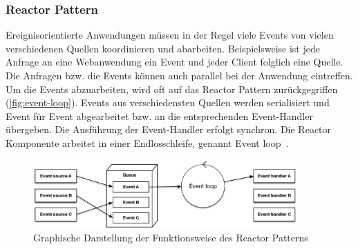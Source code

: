\subsubsection{Reactor Pattern}
Ereignisorientierte Anwendungen müssen in der Regel viele Events von vielen verschiedenen Quellen koordinieren und abarbeiten. Beispielsweise ist jede Anfrage an eine Webanwendung ein Event und jeder Client folglich eine Quelle. Die Anfragen bzw. die Events können auch parallel bei der Anwendung eintreffen.\\
Um die Events abzuarbeiten, wird oft auf das Reactor Pattern zurückgegriffen (\autoref{fig:event-loop}). Events aus verschiedensten Quellen werden serialisiert und Event für Event abgearbeitet bzw. an die entsprechenden Event-Handler übergeben. Die Ausführung der Event-Handler erfolgt synchron. Die Reactor Komponente arbeitet in einer Endlosschleife, genannt Event loop~\cite[S.~260~-~S.~261]{buschmann_pattern_2011}.

\begin{figure}[H]
 \centering
 \includegraphics[width=0.9\textwidth]{4-Hauptteil/event-loop/event-loop.eps}
 \caption{Graphische Darstellung der Funktionsweise des Reactor Patterns}
 \label{fig:event-loop}
\end{figure}


